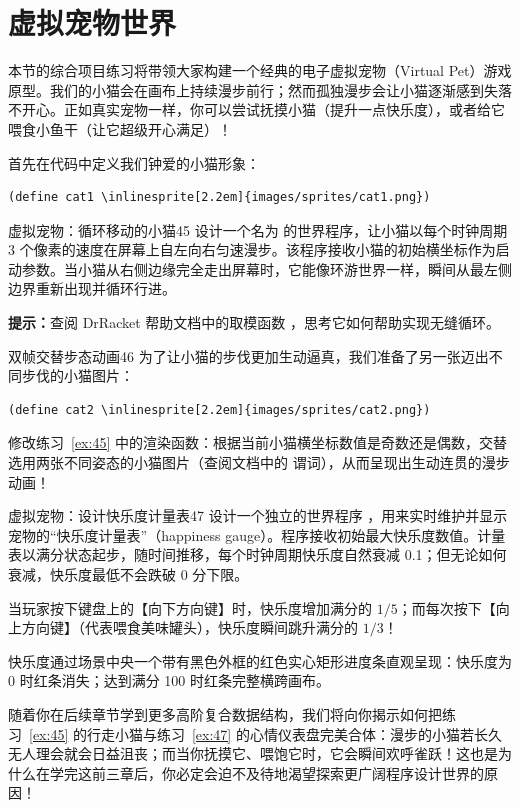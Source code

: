 \section{虚拟宠物世界}
\label{sec:3.7}

本节的综合项目练习将带领大家构建一个经典的电子虚拟宠物（Virtual Pet）游戏原型。我们的小猫会在画布上持续漫步前行；然而孤独漫步会让小猫逐渐感到失落不开心。正如真实宠物一样，你可以尝试抚摸小猫（提升一点快乐度），或者给它喂食小鱼干（让它超级开心满足）！

首先在代码中定义我们钟爱的小猫形象：
\begin{stepperbox}
\begin{Verbatim}[commandchars=\\\{\}, fontsize=\footnotesize]
(define cat1 \inlinesprite[2.2em]{images/sprites/cat1.png})
\end{Verbatim}
\end{stepperbox}

\begin{exercise}{虚拟宠物：循环移动的小猫}{45}
设计一个名为  的世界程序，让小猫以每个时钟周期 3 个像素的速度在屏幕上自左向右匀速漫步。该程序接收小猫的初始横坐标作为启动参数。当小猫从右侧边缘完全走出屏幕时，它能像环游世界一样，瞬间从最左侧边界重新出现并循环行进。

\textbf{提示：}查阅 DrRacket 帮助文档中的取模函数 ，思考它如何帮助实现无缝循环。
\end{exercise}

\begin{exercise}{双帧交替步态动画}{46}
为了让小猫的步伐更加生动逼真，我们准备了另一张迈出不同步伐的小猫图片：
\begin{stepperbox}
\begin{Verbatim}[commandchars=\\\{\}, fontsize=\footnotesize]
(define cat2 \inlinesprite[2.2em]{images/sprites/cat2.png})
\end{Verbatim}
\end{stepperbox}
修改练习~\ref{ex:45} 中的渲染函数：根据当前小猫横坐标数值是奇数还是偶数，交替选用两张不同姿态的小猫图片（查阅文档中的  谓词），从而呈现出生动连贯的漫步动画！
\end{exercise}

\begin{exercise}{虚拟宠物：设计快乐度计量表}{47}
设计一个独立的世界程序 ，用来实时维护并显示宠物的“快乐度计量表”（happiness gauge）。程序接收初始最大快乐度数值。计量表以满分状态起步，随时间推移，每个时钟周期快乐度自然衰减 0.1；但无论如何衰减，快乐度最低不会跌破 0 分下限。

当玩家按下键盘上的【向下方向键】时，快乐度增加满分的 $1/5$；而每次按下【向上方向键】（代表喂食美味罐头），快乐度瞬间跳升满分的 $1/3$！

快乐度通过场景中央一个带有黑色外框的红色实心矩形进度条直观呈现：快乐度为 0 时红条消失；达到满分 100 时红条完整横跨画布。
\end{exercise}

\vspace{1em}
\begin{notebox}[更宏大的宠物世界愿景]
随着你在后续章节学到更多高阶复合数据结构，我们将向你揭示如何把练习~\ref{ex:45} 的行走小猫与练习~\ref{ex:47} 的心情仪表盘完美合体：漫步的小猫若长久无人理会就会日益沮丧；而当你抚摸它、喂饱它时，它会瞬间欢呼雀跃！这也是为什么在学完这前三章后，你必定会迫不及待地渴望探索更广阔程序设计世界的原因！
\end{notebox}
